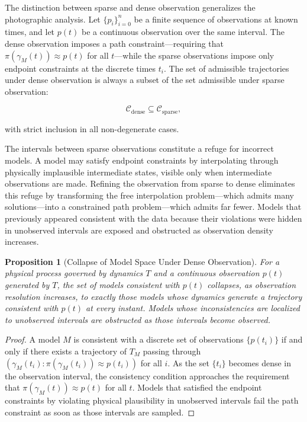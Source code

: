 \documentclass[12pt, a4paper, oneside]{article}
\theoremstyle{plain}
\newtheorem{proposition}[theorem]{Proposition}
\theoremstyle{definition}
\theoremstyle{remark}
\newcommand{\T}{T}
\newcommand{\proj}{\pi}
\begin{document}
The distinction between sparse and dense observation generalizes the photographic analysis. Let $\{p_i\}_{i=0}^n$ be a finite sequence of observations at known times, and let $p(t)$ be a continuous observation over the same interval. The dense observation imposes a path constraint---requiring that $\proj(\gamma_M(t)) \approx p(t)$ for all $t$---while the sparse observations impose only endpoint constraints at the discrete times $t_i$. The set of admissible trajectories under dense observation is always a subset of the set admissible under sparse observation:

\begin{equation}
\mathcal{C}_{\mathrm{dense}} \subseteq \mathcal{C}_{\mathrm{sparse}},
\end{equation}

with strict inclusion in all non-degenerate cases.

The intervals between sparse observations constitute a refuge for incorrect models. A model may satisfy endpoint constraints by interpolating through physically implausible intermediate states, visible only when intermediate observations are made. Refining the observation from sparse to dense eliminates this refuge by transforming the free interpolation problem---which admits many solutions---into a constrained path problem---which admits far fewer. Models that previously appeared consistent with the data because their violations were hidden in unobserved intervals are exposed and obstructed as observation density increases.

\begin{proposition}[Collapse of Model Space Under Dense Observation]
\label{prop:dense-collapse}
For a physical process governed by dynamics $\T$ and a continuous observation $p(t)$ generated by $\T$, the set of models consistent with $p(t)$ collapses, as observation resolution increases, to exactly those models whose dynamics generate a trajectory consistent with $p(t)$ at every instant. Models whose inconsistencies are localized to unobserved intervals are obstructed as those intervals become observed.
\end{proposition}

\begin{proof}
A model $M$ is consistent with a discrete set of observations $\{p(t_i)\}$ if and only if there exists a trajectory of $\T_M$ passing through $(\gamma_M(t_i) : \proj(\gamma_M(t_i)) \approx p(t_i))$ for all $i$. As the set $\{t_i\}$ becomes dense in the observation interval, the consistency condition approaches the requirement that $\proj(\gamma_M(t)) \approx p(t)$ for all $t$. Models that satisfied the endpoint constraints by violating physical plausibility in unobserved intervals fail the path constraint as soon as those intervals are sampled.
\end{proof}
\end{document}
